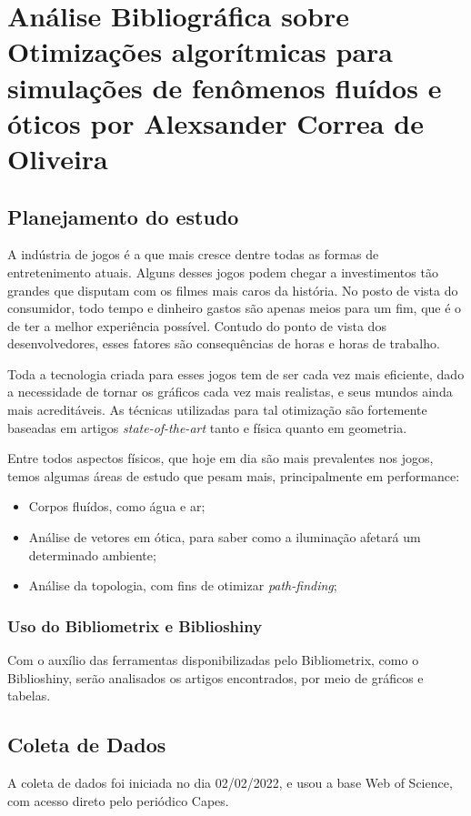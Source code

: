 \chapter{Análise Bibliográfica sobre Otimizações algorítmicas para simulações de fenômenos fluídos e óticos por Alexsander Correa de Oliveira}

\section{Planejamento do estudo}
    A indústria de jogos é a que mais cresce dentre todas as formas de entretenimento atuais. Alguns desses jogos podem chegar a investimentos tão grandes que disputam com os filmes mais caros da história. No posto de vista do consumidor, todo tempo e dinheiro gastos são apenas meios para um fim, que é o de ter a melhor experiência possível. Contudo do ponto de vista dos desenvolvedores, esses fatores são consequências de horas e horas de trabalho.
    
    Toda a tecnologia criada para esses jogos tem de ser cada vez mais eficiente, dado a necessidade de tornar os gráficos cada vez mais realistas, e seus mundos ainda mais acreditáveis. As técnicas utilizadas para tal otimização são fortemente baseadas em artigos \emph{state-of-the-art} tanto e física quanto em geometria.
    
    Entre todos aspectos físicos, que hoje em dia são mais prevalentes nos jogos, temos algumas áreas de estudo que pesam mais, principalmente em performance: 
    \begin{itemize}
        \item Corpos fluídos, como água e ar;
        \item Análise de vetores em ótica, para saber como a iluminação afetará um determinado ambiente;
        \item Análise da topologia, com fins de otimizar \emph{path-finding};
    \end{itemize}
\subsection{Uso do Bibliometrix e Biblioshiny}
     Com o auxílio das ferramentas disponibilizadas pelo Bibliometrix, como o Biblioshiny, serão analisados os artigos encontrados, por meio de gráficos e tabelas.   
\section{Coleta de Dados}
    A coleta de dados foi iniciada no dia 02/02/2022, e usou a base Web of Science, com acesso direto pelo periódico Capes.
    
